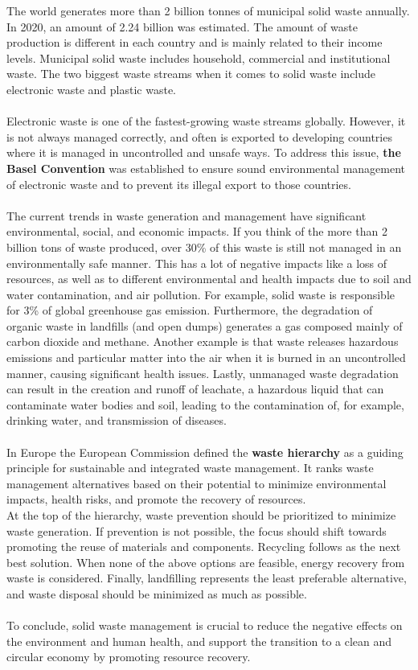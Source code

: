 \documentclass[../summary.tex]{subfiles}
\begin{document}
	The world generates more than 2 billion tonnes of municipal solid waste annually. In 2020, an amount of 2.24 billion was estimated. The amount of waste production is different in each country and is mainly related to their income levels. Municipal solid waste includes household, commercial and institutional waste. The two biggest waste streams when it comes to solid waste include electronic waste and plastic waste.
	\\\\
	Electronic waste is one of the fastest-growing waste streams globally. However, it is not always managed correctly, and often is exported to developing countries where it is managed in uncontrolled and unsafe ways. To address this issue, \textbf{the Basel Convention} was established to ensure sound environmental management of electronic waste and to prevent its illegal export to those countries.
	\\\\
	The current trends in waste generation and management have significant environmental, social, and economic impacts. If you think of the more than 2 billion tons of waste produced, over 30\% of this waste is still not managed in an environmentally safe manner. This has a lot of negative impacts like a loss of resources, as well as to different environmental and health impacts due to soil and water contamination, and air pollution. For example, solid waste is responsible for 3\% of global greenhouse gas emission. Furthermore, the degradation of organic waste in landfills (and open dumps) generates a gas composed mainly of carbon dioxide and methane. Another example is that waste releases hazardous emissions and particular matter into the air when it is burned in an uncontrolled manner, causing significant health issues. Lastly, unmanaged waste degradation can result in the creation and runoff of leachate, a hazardous liquid that can contaminate water bodies and soil, leading to the contamination of, for example, drinking water, and transmission of diseases.
	\\\\
	In Europe the European Commission defined the \textbf{waste hierarchy} as a guiding principle for sustainable and integrated waste management. It ranks waste management alternatives based on their potential to minimize environmental impacts, health risks, and promote the recovery of resources. \\
	At the top of the hierarchy, waste prevention should be prioritized to minimize waste generation. If prevention is not possible, the focus should shift towards promoting the reuse of materials and components. Recycling follows as the next best solution. When none of the above options are feasible, energy recovery from waste is considered. Finally, landfilling represents the least preferable alternative, and waste disposal should be minimized as much as possible.
	\\\\
	To conclude, solid waste management is crucial to reduce the negative effects on the environment and human health, and support the transition to a clean and circular economy by promoting resource recovery.  
	
\end{document}
